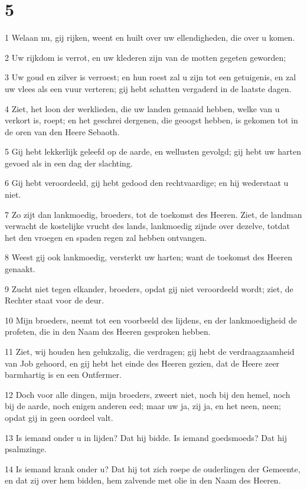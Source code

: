 \chapter{5}

\par 1 Welaan nu, gij rijken, weent en huilt over uw ellendigheden, die over u komen.
\par 2 Uw rijkdom is verrot, en uw klederen zijn van de motten gegeten geworden;
\par 3 Uw goud en zilver is verroest; en hun roest zal u zijn tot een getuigenis, en zal uw vlees als een vuur verteren; gij hebt schatten vergaderd in de laatste dagen.
\par 4 Ziet, het loon der werklieden, die uw landen gemaaid hebben, welke van u verkort is, roept; en het geschrei dergenen, die geoogst hebben, is gekomen tot in de oren van den Heere Sebaoth.
\par 5 Gij hebt lekkerlijk geleefd op de aarde, en wellusten gevolgd; gij hebt uw harten gevoed als in een dag der slachting.
\par 6 Gij hebt veroordeeld, gij hebt gedood den rechtvaardige; en hij wederstaat u niet.
\par 7 Zo zijt dan lankmoedig, broeders, tot de toekomst des Heeren. Ziet, de landman verwacht de kostelijke vrucht des lands, lankmoedig zijnde over dezelve, totdat het den vroegen en spaden regen zal hebben ontvangen.
\par 8 Weest gij ook lankmoedig, versterkt uw harten; want de toekomst des Heeren genaakt.
\par 9 Zucht niet tegen elkander, broeders, opdat gij niet veroordeeld wordt; ziet, de Rechter staat voor de deur.
\par 10 Mijn broeders, neemt tot een voorbeeld des lijdens, en der lankmoedigheid de profeten, die in den Naam des Heeren gesproken hebben.
\par 11 Ziet, wij houden hen gelukzalig, die verdragen; gij hebt de verdraagzaamheid van Job gehoord, en gij hebt het einde des Heeren gezien, dat de Heere zeer barmhartig is en een Ontfermer.
\par 12 Doch voor alle dingen, mijn broeders, zweert niet, noch bij den hemel, noch bij de aarde, noch enigen anderen eed; maar uw ja, zij ja, en het neen, neen; opdat gij in geen oordeel valt.
\par 13 Is iemand onder u in lijden? Dat hij bidde. Is iemand goedsmoeds? Dat hij psalmzinge.
\par 14 Is iemand krank onder u? Dat hij tot zich roepe de ouderlingen der Gemeente, en dat zij over hem bidden, hem zalvende met olie in den Naam des Heeren.
